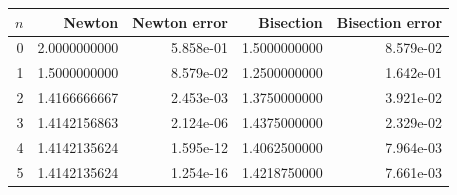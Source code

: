 \begin{tabular}{rrrrr}
\toprule
$n$ & Newton & Newton error & Bisection & Bisection error \\
\midrule
0 & 2.0000000000 & 5.858e-01 & 1.5000000000 & 8.579e-02 \\
1 & 1.5000000000 & 8.579e-02 & 1.2500000000 & 1.642e-01 \\
2 & 1.4166666667 & 2.453e-03 & 1.3750000000 & 3.921e-02 \\
3 & 1.4142156863 & 2.124e-06 & 1.4375000000 & 2.329e-02 \\
4 & 1.4142135624 & 1.595e-12 & 1.4062500000 & 7.964e-03 \\
5 & 1.4142135624 & 1.254e-16 & 1.4218750000 & 7.661e-03 \\
\bottomrule
\end{tabular}
